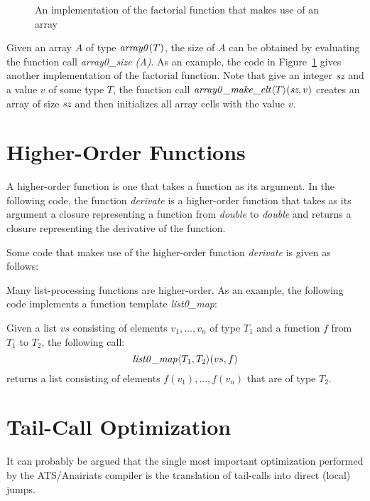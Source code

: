 \begin{figure}[thp]

\caption{An implementation of the factorial function that makes use of an array}
\label{figure:array0_example_2}
\end{figure}
Given an array $A$ of type ${\it array0}(T)$, the size of $A$ can be
obtained by evaluating the function call {\it array0\_size (A)}. As an
example, the code in Figure~\ref{figure:array0_example_2} gives another
implementation of the factorial function.  Note that give an integer
$\mbox{\it sz}$ and a value $v$ of some type $T$, the function call ${\it
array0\_make\_elt}\langle T\rangle (\mbox{\it sz}, v)$ creates an array of
size $\mbox{\it sz}$ and then initializes all array cells with the value
$v$.

\section{Higher-Order Functions}
A higher-order function is one that takes a function as its argument.  In
the following code, the function {\it derivate} is a higher-order function
that takes as its argument a closure representing a function from {\it
double} to {\it double} and returns a closure representing the derivative
of the function.

Some code that makes use of the higher-order function {\it derivate}
is given as follows:

Many list-processing functions are higher-order. As an example,
the following code implements a function template {\it list0\_map}:

Given a list $vs$ consisting of elements $v_1,\ldots,v_n$ of type $T_1$ and
a function $f$ from $T_1$ to $T_2$, the following call: $${\it
list0\_map}\langle T_1,T_2\rangle(vs, f)$$ returns a list consisting
of elements $f(v_1),\ldots, f(v_n)$ that are of type $T_2$.


\section{Tail-Call Optimization}

It can probably be argued that the single most important optimization
performed by the ATS/Anairiats compiler is the translation of tail-calls
into direct (local) jumps.

